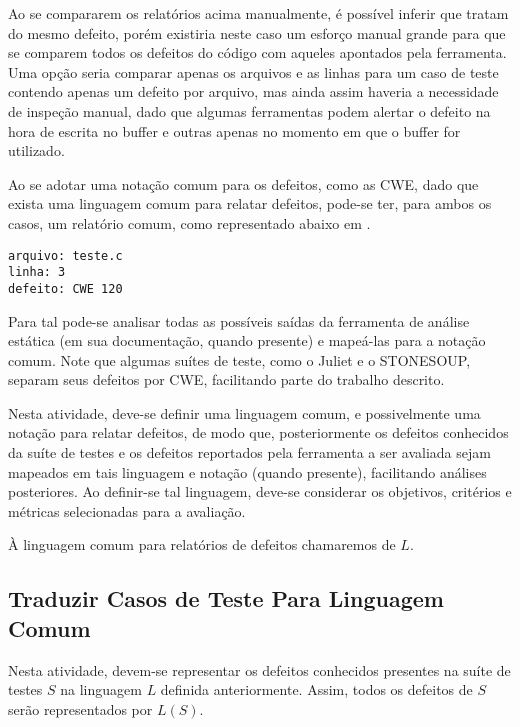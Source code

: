 Ao se compararem os relatórios acima manualmente, é possível inferir que tratam do mesmo defeito, porém existiria neste caso um esforço manual grande para que se comparem todos os defeitos do código com aqueles apontados pela ferramenta. Uma opção seria comparar apenas os arquivos e as linhas para um caso de teste contendo apenas um defeito por arquivo, mas ainda assim haveria a necessidade de inspeção manual, dado que algumas ferramentas podem alertar o defeito na hora de escrita no buffer e outras apenas no momento em que o buffer for utilizado.

Ao se adotar uma notação comum para os defeitos, como as CWE, dado que exista uma linguagem comum para relatar defeitos, pode-se ter, para ambos os casos, um relatório comum, como representado abaixo em .
\begin{lstlisting}[caption=Relatório comum, label=relatorio_comum]
arquivo: teste.c
linha: 3
defeito: CWE 120
\end{lstlisting}
Para tal pode-se analisar todas as possíveis saídas da ferramenta de análise estática (em sua documentação, quando presente) e mapeá-las para a notação comum. Note que algumas suítes de teste, como o Juliet e o STONESOUP, separam seus defeitos por CWE, facilitando parte do trabalho descrito.

Nesta atividade, deve-se definir uma linguagem comum, e possivelmente uma notação para relatar defeitos, de modo que, posteriormente os defeitos conhecidos da suíte de testes e os defeitos reportados pela ferramenta a ser avaliada sejam mapeados em tais linguagem e notação (quando presente), facilitando análises posteriores. Ao definir-se tal linguagem, deve-se considerar os objetivos, critérios e métricas selecionadas para a avaliação.

À linguagem comum para relatórios de defeitos chamaremos de $L$.

\subsection{Traduzir Casos de Teste Para Linguagem Comum}

Nesta atividade, devem-se representar os defeitos conhecidos presentes na suíte de testes $S$ na linguagem $L$ definida anteriormente.
Assim, todos os defeitos de $S$ serão representados por $L(S)$.

